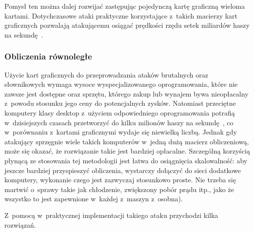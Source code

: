 Pomysł ten można dalej rozwijać zastępując pojedynczą kartę graficzną wieloma
kartami. Dotychczasowe ataki praktyczne korzystające z~takich macierzy kart
graficznych pozwalają atakującemu osiągać prędkości rzędu setek miliardów haszy
na sekundę~\cite{gpu_cracking_parallel}.



\subsubsection{Obliczenia równoległe}

Użycie kart graficznych do przeprowadzania ataków brutalnych oraz słownikowych
wymaga wysoce wyspecjalizowanego oprogramowania, które nie zawsze jest dostępne
oraz sprzętu, którego zakup lub wynajem bywa nieopłacalny z~powodu stosunku
jego ceny do potencjalnych zysków. Natomiast przeciętne komputery klasy desktop
z~użyciem odpowiedniego oprogramowania potrafią w~dzisiejszych czasach
przetworzyć do kilku milionów haszy na
sekundę~\cite{oclhashcat,john_the_ripper_benchmarks}, co w~porównaniu z~kartami
graficznymi wydaje się niewielką liczbą. Jednak gdy atakujący sprzęgnie wiele
takich komputerów w~jedną dużą macierz obliczeniową, może się okazać, że
rozwiązanie takie jest bardziej opłacalne. Szczególną korzyścią płynącą ze
stosowania tej metodologii jest łatwa do osiągnięcia skalowalność: aby jeszcze
bardziej przyspieszyć obliczenia, wystarczy dołączyć do sieci dodatkowe
komputery, wykonanie czego jest zazwyczaj stosunkowo proste. Nie trzeba się
martwić o~sprawy takie jak chłodzenie, zwiększony pobór prądu itp., jako że
wszystko to jest zapewnione w~każdej z~maszyn z~osobna).

Z~pomocą w~praktycznej implementacji takiego ataku przychodzi kilka rozwiązań.

